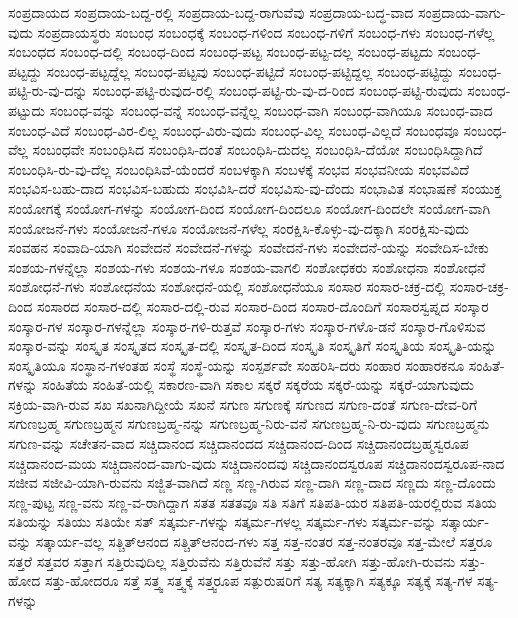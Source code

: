 {ಸಂಪ್ರದಾಯದ
ಸಂಪ್ರದಾಯ-ಬದ್ದ-ರಲ್ಲಿ
ಸಂಪ್ರದಾಯ-ಬದ್ದ-ರಾಗುವೆವು
ಸಂಪ್ರದಾಯ-ಬದ್ಧ-ವಾದ
ಸಂಪ್ರದಾಯ-ವಾಗು-ವುದು
ಸಂಪ್ರದಾಯಸ್ಥರು
ಸಂಬಂಧ
ಸಂಬಂಧಕ್ಕೆ
ಸಂಬಂಧ-ಗಳಿಂದ
ಸಂಬಂಧ-ಗಳಿಗೆ
ಸಂಬಂಧ-ಗಳು
ಸಂಬಂಧ-ಗಳೆಲ್ಲ
ಸಂಬಂಧದ
ಸಂಬಂಧ-ದಲ್ಲಿ
ಸಂಬಂಧ-ದಿಂದ
ಸಂಬಂಧ-ಪಟ್ಟ
ಸಂಬಂಧ-ಪಟ್ಟ-ದಲ್ಲ
ಸಂಬಂಧ-ಪಟ್ಟದು
ಸಂಬಂಧ-ಪಟ್ಟದ್ದು
ಸಂಬಂಧ-ಪಟ್ಟದ್ದೆಲ್ಲ
ಸಂಬಂಧ-ಪಟ್ಟವು
ಸಂಬಂಧ-ಪಟ್ಟಿದೆ
ಸಂಬಂಧ-ಪಟ್ಟಿದ್ದಲ್ಲ
ಸಂಬಂಧ-ಪಟ್ಟಿದ್ದು
ಸಂಬಂಧ-ಪಟ್ಟಿ-ರು-ವು-ದನ್ನು
ಸಂಬಂಧ-ಪಟ್ಟಿ-ರುವುದ-ರಲ್ಲಿ
ಸಂಬಂಧ-ಪಟ್ಟಿ-ರು-ವು-ದ-ರಿಂದ
ಸಂಬಂಧ-ಪಟ್ಟಿ-ರುವುದು
ಸಂಬಂಧ-ಪಟ್ಟುದು
ಸಂಬಂಧ-ವನ್ನು
ಸಂಬಂಧ-ವನ್ನೆ
ಸಂಬಂಧ-ವನ್ನೆಲ್ಲ
ಸಂಬಂಧ-ವಾಗಿ
ಸಂಬಂಧ-ವಾಗಿಯೂ
ಸಂಬಂಧ-ವಾದ
ಸಂಬಂಧ-ವಿದೆ
ಸಂಬಂಧ-ವಿರ-ಲಿಲ್ಲ
ಸಂಬಂಧ-ವಿರು-ವುದು
ಸಂಬಂಧ-ವಿಲ್ಲ
ಸಂಬಂಧ-ವಿಲ್ಲದೆ
ಸಂಬಂಧವೂ
ಸಂಬಂಧ-ವೆಲ್ಲ
ಸಂಬಂಧವೇ
ಸಂಬಂಧಿಸಿದ
ಸಂಬಂಧಿಸಿ-ದಂತೆ
ಸಂಬಂಧಿಸಿ-ದುದಲ್ಲ
ಸಂಬಂಧಿಸಿ-ದೆಯೋ
ಸಂಬಂಧಿಸಿದ್ದಾಗಿದೆ
ಸಂಬಂಧಿಸಿ-ರು-ವು-ದೆಲ್ಲ
ಸಂಬಂಧಿಸಿವೆ-ಯೆಂದರೆ
ಸಂಬಳಕ್ಕಾಗಿ
ಸಂಬಳಕ್ಕೆ
ಸಂಭವ
ಸಂಭವನೀಯ
ಸಂಭವವಿದೆ
ಸಂಭವಿಸ-ಬಹು-ದಾದ
ಸಂಭವಿಸ-ಬಹುದು
ಸಂಭವಿಸಿ-ದರೆ
ಸಂಭವಿಸು-ವು-ದೆಂದು
ಸಂಭಾವಿತ
ಸಂಭಾಷಣೆ
ಸಂಯುಕ್ತ
ಸಂಯೋಗಕ್ಕೆ
ಸಂಯೋಗ-ಗಳನ್ನು
ಸಂಯೋಗ-ದಿಂದ
ಸಂಯೋಗ-ದಿಂದಲೂ
ಸಂಯೋಗ-ದಿಂದಲೇ
ಸಂಯೋಗ-ವಾಗಿ
ಸಂಯೋಜನೆ-ಗಳು
ಸಂಯೋಜನೆ-ಗಳೂ
ಸಂಯೋಜನೆ-ಗಳೆಲ್ಲ
ಸಂರಕ್ಷಿಸಿ-ಕೊಳ್ಳು-ವು-ದಕ್ಕಾಗಿ
ಸಂರಕ್ಷಿಸು-ವುದು
ಸಂವಹನ
ಸಂವಾದಿ-ಯಾಗಿ
ಸಂವೇದನೆ
ಸಂವೇದನೆ-ಗಳನ್ನು
ಸಂವೇದನೆ-ಗಳು
ಸಂವೇದನೆ-ಯನ್ನು
ಸಂವೇದಿಸ-ಬೇಕು
ಸಂಶಯ-ಗಳನ್ನೆಲ್ಲಾ
ಸಂಶಯ-ಗಳು
ಸಂಶಯ-ಗಳೂ
ಸಂಶಯ-ವಾಗಲಿ
ಸಂಶೋಧಕರು
ಸಂಶೋಧನಾ
ಸಂಶೋಧನೆ
ಸಂಶೋಧನೆ-ಗಳು
ಸಂಶೋಧನೆಯ
ಸಂಶೋಧನೆ-ಯಲ್ಲಿ
ಸಂಶೋಧನೆಯೂ
ಸಂಸಾರ
ಸಂಸಾರ-ಚಕ್ರ-ದಲ್ಲಿ
ಸಂಸಾರ-ಚಕ್ರ-ದಿಂದ
ಸಂಸಾರದ
ಸಂಸಾರ-ದಲ್ಲಿ
ಸಂಸಾರ-ದಲ್ಲಿ-ರುವ
ಸಂಸಾರ-ದಿಂದ
ಸಂಸಾರ-ದೊಂದಿಗೆ
ಸಂಸಾರಸ್ವಪ್ನದ
ಸಂಸ್ಕಾರ
ಸಂಸ್ಕಾರ-ಗಳ
ಸಂಸ್ಕಾರ-ಗಳನ್ನೆಲ್ಲಾ
ಸಂಸ್ಕಾರ-ಗಳಿ-ರುತ್ತವೆ
ಸಂಸ್ಕಾರ-ಗಳು
ಸಂಸ್ಕಾರ-ಗಳೊ-ಡನೆ
ಸಂಸ್ಕಾರ-ಗೊಳಿಸುವ
ಸಂಸ್ಕಾರ-ವನ್ನು
ಸಂಸ್ಕೃತ
ಸಂಸ್ಕೃತದ
ಸಂಸ್ಕೃತ-ದಲ್ಲಿ
ಸಂಸ್ಕೃತ-ದಿಂದ
ಸಂಸ್ಕೃತಿ
ಸಂಸ್ಕೃತಿಗೆ
ಸಂಸ್ಕೃತಿಯ
ಸಂಸ್ಕೃತಿ-ಯನ್ನು
ಸಂಸ್ಕೃತಿಯೂ
ಸಂಸ್ಥಾನ-ಗಳಂತಹ
ಸಂಸ್ಥೆ
ಸಂಸ್ಥೆ-ಯನ್ನು
ಸಂಸ್ಪರ್ಶವೇ
ಸಂಹರಿಸಿ-ದರು
ಸಂಹಾರ
ಸಂಹಾರಕನೂ
ಸಂಹಿತೆ-ಗಳನ್ನು
ಸಂಹಿತೆಯ
ಸಂಹಿತೆ-ಯಲ್ಲಿ
ಸಕಾರಣ-ವಾಗಿ
ಸಕಾಲ
ಸಕ್ಕರೆ
ಸಕ್ಕರೆಯ
ಸಕ್ಕರೆ-ಯನ್ನು
ಸಕ್ಕರೆ-ಯಾಗುವುದು
ಸಕ್ರಿಯ-ವಾಗಿ-ರುವ
ಸಖ
ಸಖನಾಗಿದ್ದೀಯೆ
ಸಖನೆ
ಸಗುಣ
ಸಗುಣಕ್ಕೆ
ಸಗುಣದ
ಸಗುಣ-ದಂತೆ
ಸಗುಣ-ದೇವ-ರಿಗೆ
ಸಗುಣಬ್ರಹ್ಮ
ಸಗುಣಬ್ರಹ್ಮನ
ಸಗುಣಬ್ರಹ್ಮ-ನನ್ನು
ಸಗುಣಬ್ರಹ್ಮ-ನಿರು-ವನೆ
ಸಗುಣಬ್ರಹ್ಮ-ನಿ-ರು-ವುದು
ಸಗುಣಬ್ರಹ್ಮನು
ಸಗುಣ-ವನ್ನು
ಸಚೇತನ-ವಾದ
ಸಚ್ಚಿದಾನಂದ
ಸಚ್ಚಿದಾನಂದದ
ಸಚ್ಚಿದಾನಂದ-ದಿಂದ
ಸಚ್ಚಿದಾನಂದಬ್ರಹ್ಮಸ್ವರೂಪ
ಸಚ್ಚಿದಾನಂದ-ಮಯ
ಸಚ್ಚಿದಾನಂದ-ವಾಗು-ವುದು
ಸಚ್ಚಿದಾನಂದವು
ಸಚ್ಚಿದಾನಂದಸ್ವರೂಪ
ಸಚ್ಚಿದಾನಂದಸ್ವರೂಪ-ನಾದ
ಸಜೀವ
ಸಜೀವಿ-ಯಾಗಿ-ರುವನು
ಸಜ್ಜಿತ-ವಾಗಿದೆ
ಸಣ್ಣ
ಸಣ್ಣ-ಗಿರುವ
ಸಣ್ಣ-ದಾಗಿ
ಸಣ್ಣ-ದಾದ
ಸಣ್ಣದು
ಸಣ್ಣ-ದೊಂದು
ಸಣ್ಣ-ಪುಟ್ಟ
ಸಣ್ಣ-ವನು
ಸಣ್ಣ-ವ-ರಾಗಿದ್ದಾಗ
ಸತತ
ಸತತವೂ
ಸತಿ
ಸತಿಗೆ
ಸತಿಪತಿ-ಯರ
ಸತಿಪತಿ-ಯರಲ್ಲಿರುವ
ಸತಿಯ
ಸತಿಯನ್ನು
ಸತಿಯು
ಸತಿಯೇ
ಸತ್
ಸತ್ಕರ್ಮ-ಗಳನ್ನು
ಸತ್ಕರ್ಮ-ಗಳಲ್ಲ
ಸತ್ಕರ್ಮ-ಗಳು
ಸತ್ಕರ್ಮ-ವನ್ನು
ಸತ್ಕಾರ್ಯ-ವನ್ನು
ಸತ್ಕಾರ್ಯ-ವಲ್ಲ
ಸತ್ಚಿತ್ಆನಂದ
ಸತ್ಚಿತ್ಆನಂದ-ಗಳು
ಸತ್ತ
ಸತ್ತ-ನಂತರ
ಸತ್ತ-ನಂತರವೂ
ಸತ್ತ-ಮೇಲೆ
ಸತ್ತರೂ
ಸತ್ತರೆ
ಸತ್ತವರ
ಸತ್ತಾಗ
ಸತ್ತಿರುವುದಿಲ್ಲ
ಸತ್ತಿರುವೆನು
ಸತ್ತಿರುವೆನೆ
ಸತ್ತು
ಸತ್ತು-ಹೋಗಿ
ಸತ್ತು-ಹೋಗಿ-ರುವನು
ಸತ್ತು-ಹೋದ
ಸತ್ತು-ಹೋದರೂ
ಸತ್ತೆ
ಸತ್ತ್ವ
ಸತ್ತ್ವಕ್ಕೆ
ಸತ್ತ್ವರೂಪ
ಸತ್ಪುರುಷರಿಗೆ
ಸತ್ಯ
ಸತ್ಯಕ್ಕಾಗಿ
ಸತ್ಯಕ್ಕೂ
ಸತ್ಯಕ್ಕೆ
ಸತ್ಯ-ಗಳ
ಸತ್ಯ-ಗಳನ್ನು
}
